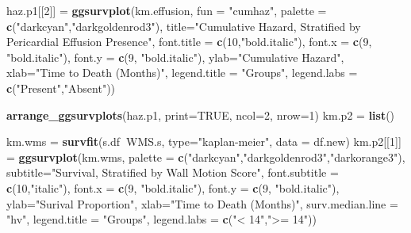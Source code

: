 \documentclass[
]{article}
\newenvironment{Shaded}{\begin{snugshade}}{\end{snugshade}}
\newcommand{\DataTypeTok}[1]{\textcolor[rgb]{0.13,0.29,0.53}{#1}}
\newcommand{\DecValTok}[1]{\textcolor[rgb]{0.00,0.00,0.81}{#1}}
\newcommand{\KeywordTok}[1]{\textcolor[rgb]{0.13,0.29,0.53}{\textbf{#1}}}
\newcommand{\NormalTok}[1]{#1}
\newcommand{\OperatorTok}[1]{\textcolor[rgb]{0.81,0.36,0.00}{\textbf{#1}}}
\newcommand{\OtherTok}[1]{\textcolor[rgb]{0.56,0.35,0.01}{#1}}
\newcommand{\StringTok}[1]{\textcolor[rgb]{0.31,0.60,0.02}{#1}}
\begin{document}
\begin{Shaded}
\begin{Highlighting}[]
{{{\NormalTok{haz.p1[[}\DecValTok{2}\NormalTok{]] =}\StringTok{ }\KeywordTok{ggsurvplot}\NormalTok{(km.effusion, }
           \DataTypeTok{fun =} \StringTok{"cumhaz"}\NormalTok{,}
           \DataTypeTok{palette =} \KeywordTok{c}\NormalTok{(}\StringTok{"darkcyan"}\NormalTok{,}\StringTok{"darkgoldenrod3"}\NormalTok{), }
           \DataTypeTok{title=}\StringTok{"Cumulative Hazard, Stratified by Pericardial Effusion Presence"}\NormalTok{,}
           \DataTypeTok{font.title =} \KeywordTok{c}\NormalTok{(}\DecValTok{10}\NormalTok{,}\StringTok{"bold.italic"}\NormalTok{),}
           \DataTypeTok{font.x =} \KeywordTok{c}\NormalTok{(}\DecValTok{9}\NormalTok{, }\StringTok{"bold.italic"}\NormalTok{),}
           \DataTypeTok{font.y =} \KeywordTok{c}\NormalTok{(}\DecValTok{9}\NormalTok{, }\StringTok{"bold.italic"}\NormalTok{),}
           \DataTypeTok{ylab=}\StringTok{"Cumulative Hazard"}\NormalTok{, }
           \DataTypeTok{xlab=}\StringTok{"Time to Death (Months)"}\NormalTok{,}
           \DataTypeTok{legend.title =} \StringTok{"Groups"}\NormalTok{,}
           \DataTypeTok{legend.labs =} \KeywordTok{c}\NormalTok{(}\StringTok{"Present"}\NormalTok{,}\StringTok{"Absent"}\NormalTok{))}

\KeywordTok{arrange_ggsurvplots}\NormalTok{(haz.p1, }\DataTypeTok{print=}\OtherTok{TRUE}\NormalTok{, }\DataTypeTok{ncol=}\DecValTok{2}\NormalTok{, }\DataTypeTok{nrow=}\DecValTok{1}\NormalTok{)}
\NormalTok{km.p2 =}\StringTok{ }\KeywordTok{list}\NormalTok{()}

\NormalTok{km.wms =}\StringTok{ }\KeywordTok{survfit}\NormalTok{(s.df}\OperatorTok{~}\NormalTok{WMS.s, }\DataTypeTok{type=}\StringTok{"kaplan-meier"}\NormalTok{, }\DataTypeTok{data =}\NormalTok{ df.new)}
\NormalTok{km.p2[[}\DecValTok{1}\NormalTok{]] =}\StringTok{ }\KeywordTok{ggsurvplot}\NormalTok{(km.wms, }
                           \DataTypeTok{palette =} \KeywordTok{c}\NormalTok{(}\StringTok{"darkcyan"}\NormalTok{,}\StringTok{"darkgoldenrod3"}\NormalTok{,}\StringTok{"darkorange3"}\NormalTok{), }
                           \DataTypeTok{subtitle=}\StringTok{"Survival, Stratified by Wall Motion Score"}\NormalTok{,}
                           \DataTypeTok{font.subtitle =} \KeywordTok{c}\NormalTok{(}\DecValTok{10}\NormalTok{,}\StringTok{"italic"}\NormalTok{),}
                           \DataTypeTok{font.x =} \KeywordTok{c}\NormalTok{(}\DecValTok{9}\NormalTok{, }\StringTok{"bold.italic"}\NormalTok{),}
                           \DataTypeTok{font.y =} \KeywordTok{c}\NormalTok{(}\DecValTok{9}\NormalTok{, }\StringTok{"bold.italic"}\NormalTok{),}
                           \DataTypeTok{ylab=}\StringTok{"Surival Proportion"}\NormalTok{, }
                           \DataTypeTok{xlab=}\StringTok{"Time to Death (Months)"}\NormalTok{,}
                           \DataTypeTok{surv.median.line =} \StringTok{"hv"}\NormalTok{,}
                           \DataTypeTok{legend.title =} \StringTok{"Groups"}\NormalTok{,}
                           \DataTypeTok{legend.labs =} \KeywordTok{c}\NormalTok{(}\StringTok{"< 14"}\NormalTok{,}\StringTok{">= 14"}\NormalTok{))}

}}}
\end{Highlighting}
\end{Shaded}
\end{document}
